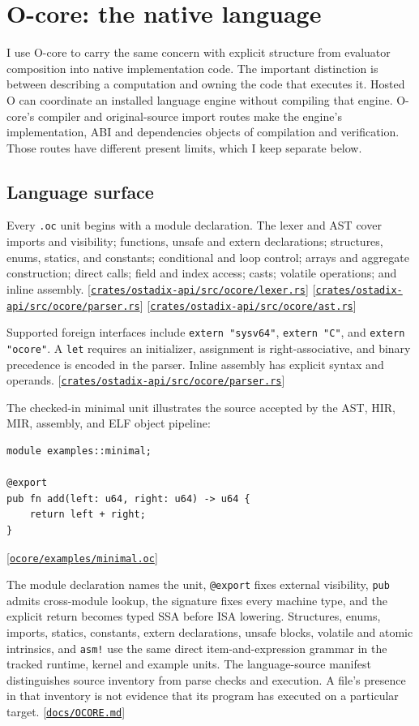 \documentclass[11pt,oneside]{article}
\newcommand{\src}[1]{\textcolor{OSlate}{\scriptsize[\href{https://github.com/lostadi/OSTADIX/blob/c0b02c326b2329a95ba52447c7180bc93957cd57/#1}{\nolinkurl{#1}}]}\allowbreak}
\begin{document}
\section{O-core: the native language}
\label{sec:ocore}

I use O-core to carry the same concern with explicit structure from evaluator
composition into native implementation code. The important distinction is
between describing a computation and owning the code that executes it.
Hosted O can coordinate an installed language engine without compiling that
engine. O-core's compiler and original-source import routes make the engine's
implementation, ABI and dependencies objects of compilation and verification.
Those routes have different present limits, which I keep separate below.

\subsection{Language surface}

Every \texttt{.oc} unit begins with a module declaration. The lexer and AST
cover imports and visibility; functions, unsafe and extern declarations;
structures, enums, statics, and constants; conditional and loop control;
arrays and aggregate construction; direct calls; field and index access;
casts; volatile operations; and inline assembly.
\src{crates/ostadix-api/src/ocore/lexer.rs}
\src{crates/ostadix-api/src/ocore/parser.rs}
\src{crates/ostadix-api/src/ocore/ast.rs}

Supported foreign interfaces include \texttt{extern "sysv64"},
\texttt{extern "C"}, and \texttt{extern "ocore"}. A \texttt{let} requires an
initializer, assignment is right-associative, and binary precedence is
encoded in the parser. Inline assembly has explicit syntax and operands.
\src{crates/ostadix-api/src/ocore/parser.rs}

The checked-in minimal unit illustrates the source accepted by the AST, HIR,
MIR, assembly, and ELF object pipeline:

\begin{lstlisting}[style=plaincode]
module examples::minimal;

@export
pub fn add(left: u64, right: u64) -> u64 {
    return left + right;
}
\end{lstlisting}
\src{ocore/examples/minimal.oc}

The module declaration names the unit, \texttt{@export} fixes external
visibility, \texttt{pub} admits cross-module lookup, the signature fixes every
machine type, and the explicit return becomes typed SSA before ISA lowering.
Structures, enums, imports, statics, constants, extern declarations, unsafe
blocks, volatile and atomic intrinsics, and \texttt{asm!} use the same direct
item-and-expression grammar in the tracked runtime, kernel and example units.
The language-source manifest distinguishes source inventory from parse checks
and execution. A file's presence in that inventory is not evidence that its
program has executed on a particular target.
\src{docs/OCORE.md}
\end{document}
